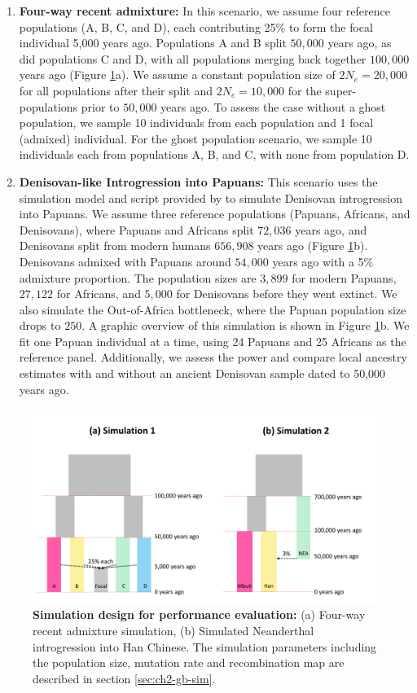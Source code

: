 \begin{enumerate}
    \item \textbf{Four-way recent admixture:} In this scenario, we assume four reference populations (A, B, C, and D), each contributing 25\% to form the focal individual 5,000 years ago. Populations A and B split $50{,}000$ years ago, as did populations C and D, with all populations merging back together $100{,}000$ years ago (Figure \ref{fig:sim1}a). We assume a constant population size of $2N_e = 20,000$ for all populations after their split and $2N_e = 10{,}000$ for the super-populations prior to $50{,}000$ years ago. To assess the case without a ghost population, we sample 10 individuals from each population and 1 focal (admixed) individual. For the ghost population scenario, we sample 10 individuals each from populations A, B, and C, with none from population D. 
    \item \textbf{Denisovan-like Introgression into Papuans:} This scenario uses the simulation model and script provided by \cite{skov2018detecting} to simulate Denisovan introgression into Papuans. We assume three reference populations (Papuans, Africans, and Denisovans), where Papuans and Africans split $72{,}036$ years ago, and Denisovans split from modern humans $656{,}908$ years ago (Figure \ref{fig:sim1}b). Denisovans admixed with Papuans around $54{,}000$ years ago with a 5\% admixture proportion. The population sizes are $3,899$ for modern Papuans, $27{,}122$ for Africans, and $5{,}000$ for Denisovans before they went extinct. We also simulate the Out-of-Africa bottleneck, where the Papuan population size drops to $250$. A graphic overview of this simulation is shown in Figure \ref{fig:sim1}b. We fit one Papuan individual at a time, using 24 Papuans and 25 Africans as the reference panel. Additionally, we assess the power and compare local ancestry estimates with and without an ancient Denisovan sample dated to 50,000 years ago.    
\end{enumerate}

\begin{figure}
    \centering
    \includegraphics[scale=0.4]{figures/sim_fig2.pdf}
    \caption{\textbf{Simulation design for performance evaluation: }(a) Four-way recent admixture simulation, (b) Simulated Neanderthal introgression into Han Chinese. The simulation parameters including the population size, mutation rate and recombination map are described in section \ref{sec:ch2-gb-sim}.}
    \label{fig:sim1}
\end{figure}

